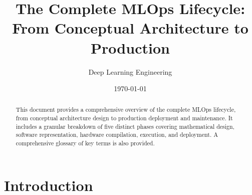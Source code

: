 \documentclass[11pt]{article}
\title{The Complete MLOps Lifecycle: \\ From Conceptual Architecture to Production}
\author{Deep Learning Engineering}
\date{\today}
\begin{document}
\maketitle

\begin{abstract}
This document provides a comprehensive overview of the complete MLOps lifecycle, from conceptual architecture design to production deployment and maintenance. It includes a granular breakdown of five distinct phases covering mathematical design, software representation, hardware compilation, execution, and deployment. A comprehensive glossary of key terms is also provided.
\end{abstract}

\tableofcontents
\newpage


\section{Introduction}
\end{document}
